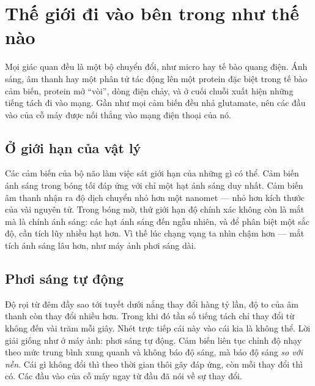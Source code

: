 \chapter{Thế giới đi vào bên trong như thế nào}

Mọi giác quan đều là một bộ chuyển đổi, như micro hay tế bào quang điện. Ánh sáng, âm thanh hay một phân tử tác động lên một protein đặc biệt trong tế bào cảm biến, protein mở ``vòi'', dòng điện chảy, và ở cuối chuỗi xuất hiện những tiếng tách đi vào mạng. Gần như mọi cảm biến đều nhả glutamate, nên các đầu vào của cỗ máy được nối thẳng vào mạng điện thoại của nó.

\section*{Ở giới hạn của vật lý}

Các cảm biến của bộ não làm việc sát giới hạn của những gì có thể. Cảm biến ánh sáng trong bóng tối đáp ứng với chỉ một hạt ánh sáng duy nhất. Cảm biến âm thanh nhận ra độ dịch chuyển nhỏ hơn một nanomet --- nhỏ hơn kích thước của vài nguyên tử. Trong bóng mờ, thứ giới hạn độ chính xác không còn là mắt mà là chính ánh sáng: các hạt ánh sáng đến ngẫu nhiên, và để phân biệt một sắc độ, cần tích lũy nhiều hạt hơn. Vì thế lúc chạng vạng ta nhìn chậm hơn --- mắt tích ánh sáng lâu hơn, như máy ảnh phơi sáng dài.

\section*{Phơi sáng tự động}

Độ rọi từ đêm đầy sao tới tuyết dưới nắng thay đổi hàng tỷ lần, độ to của âm thanh còn thay đổi nhiều hơn. Trong khi đó tần số tiếng tách chỉ thay đổi từ không đến vài trăm mỗi giây. Nhét trực tiếp cái này vào cái kia là không thể. Lời giải giống như ở máy ảnh: phơi sáng tự động. Cảm biến liên tục chỉnh độ nhạy theo mức trung bình xung quanh và không báo độ sáng, mà báo độ sáng \emph{so với nền}. Cái gì không đổi thì theo thời gian thôi gây đáp ứng, còn mỗi thay đổi thì có. Các đầu vào của cỗ máy ngay từ đầu đã nói về sự thay đổi.

